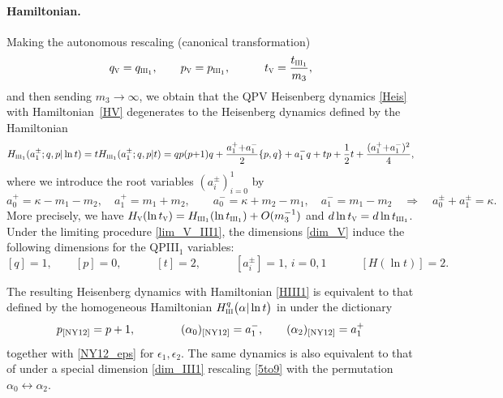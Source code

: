 \documentclass[12pt,a4paper]{article}
\numberwithin{equation}{section}
\newcommand{\V}{\scalebox{.6}{V}}
\newcommand{\III}{\scalebox{.6}{III}}
\begin{document}
\paragraph{Hamiltonian.}
Making the autonomous rescaling (canonical transformation)
\begin{equation}\label{lim_V_III1}
q_{\V}=q_{\III_1}, \qquad p_{\V}=p_{\III_1}, \qquad \quad t_{\V}=\frac{t_{\III_1}}{m_3},
 \end{equation}
 and then sending $m_3\rightarrow\infty$, we obtain that the QPV Heisenberg dynamics \eqref{Heis} with Hamiltonian~\eqref{HV} degenerates to the Heisenberg dynamics defined by the Hamiltonian
 \begin{equation}\label{HIII1}
 H_{\III_1}(a_1^{\pm};q,p|\ln t)=t H_{\III_1}(a_1^{\pm};q,p|t)=qp(p{+}1)q+\frac{a^+_1{+}a_1^-}2\{p,q\}+a_1^-q+t p+\frac12t+\frac{(a^+_1{+}a_1^-)^2}4,
 \end{equation}
where we introduce the root variables $(a_i^{\pm})_{i=0}^1$ by
\begin{equation}
a_0^+=\kappa{-}m_1{-}m_2, \quad a_1^+=m_1{+}m_2, \qquad a_0^-=\kappa{+}m_2{-}m_1, \quad a_1^-=m_1{-}m_2 \quad \Rightarrow \quad a_0^{\pm}+a_1^{\pm}=\kappa.    
\end{equation}
More precisely, we have
$H_{\V}(\ln t_{\V})=H_{\III_1}(\ln t_{\III_1})+O(m_3^{-1})$ and $d\ln t_{\V}=d\ln t_{\III_1}$.
Under the limiting procedure \eqref{lim_V_III1}, the dimensions \eqref{dim_V} induce the following dimensions for the QPIII$_1$ variables: 
\begin{equation}\label{dim_III1}
[q]=1, \qquad [p]=0, \qquad \quad [t]=2, \qquad \quad  [a_i^{\pm}]=1,\, {\scriptstyle i=0,1} \qquad \quad [H(\ln t)]=2.
\end{equation}

The resulting Heisenberg dynamics with Hamiltonian \eqref{HIII1} is
equivalent to that defined by the homogeneous Hamiltonian $H^q_{\III}\big(\alpha|\ln t\big)$ in \cite[Sec. 2.4]{NY12} under the dictionary
\begin{equation}
p_{\textrm{\cite{NY12}}}=p+1, \qquad \qquad
(\alpha_0)_{\textrm{\cite{NY12}}}=a_1^-,\qquad (\alpha_2)_{\textrm{\cite{NY12}}}=a_1^+
\end{equation}
together with \eqref{NY12_eps} for $\epsilon_1,\epsilon_2$. The same dynamics is also equivalent to that of
\cite[Sec. 5]{N12} under a special dimension \eqref{dim_III1} rescaling \eqref{5to9} with the permutation $\alpha_0\leftrightarrow \alpha_2$.
\end{document}

